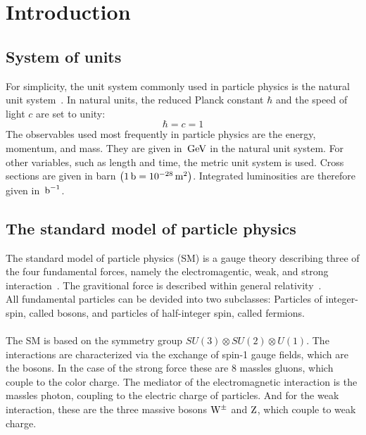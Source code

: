 \chapter{Introduction}\label{chap:introduction}

\section{System of units}\label{sec:units}

For simplicity, the unit system commonly used in particle physics is the natural unit system~\cite{UnitSystem}. In natural units, the reduced Planck constant $\hbar$ and the speed of light $c$ are set to unity:
\begin{equation}
  \hbar=c=1
\end{equation}
The observables used most frequently in particle physics are the energy, momentum, and mass. They are given in $\,\text{Ge\hspace{-.08em}V}$ in the natural unit system. For other variables, such as length and time, the metric unit system is used. Cross sections are given in barn $\left(1\,\text{b}=10^{-28}\,\text{m}^2\right)$. Integrated luminosities are therefore given in $\mbox{\ensuremath{\,\text{b}^\text{$-$1}}}$.

\section{The standard model of particle physics}\label{sec:SM}

The standard model of particle physics (SM) is a gauge theory describing three of the four fundamental forces, namely the electromagentic, weak, and strong interaction~\cite{SM}. The gravitional force is described within general relativity~\cite{Einstein}.\\
All fundamental particles can be devided into two subclasses: Particles of integer-spin, called bosons, and particles of half-integer spin, called fermions.\\\\
The SM is based on the symmetry group $SU(3)\otimes SU(2)\otimes U(1)$. The interactions are characterized via the exchange of spin-1 gauge fields, which are the bosons. In the case of the strong force these are 8 massles gluons, which couple to the color charge. The mediator of the electromagnetic interaction is the massles photon, coupling to the electric charge of particles. And for the weak interaction, these are the three massive bosons $\mathrm{W}^\pm$ and $\mathrm{Z}$, which couple to weak charge.\\

